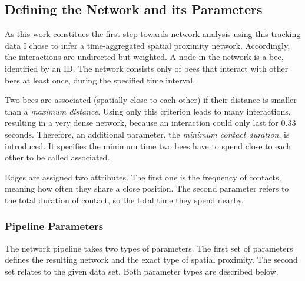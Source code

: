 \subsection{Defining the Network and its Parameters}
As this work constitues the first step towards network analysis using this tracking data I chose to infer a time-aggregated spatial proximity network.
Accordingly, the interactions are undirected but weighted.
A node in the network is a bee, identified by an ID.
The network consists only of bees that interact with other bees at least once, during the specified time interval.

Two bees are associated (spatially close to each other) if their distance is smaller than a \emph{maximum distance}.
Using only this criterion leads to many interactions, resulting in a very dense network, because an interaction could only last for 0.33 seconds.
Therefore, an additional parameter, the \emph{minimum contact duration}, is introduced.
It specifies the minimum time two bees have to spend close to each other to be called associated.

Edges are assigned two attributes.
The first one is the frequency of contacts, meaning how often they share a close position. The second parameter refers to the total duration of contact, so the total time they spend nearby.

\subsubsection{Pipeline Parameters}
The network pipeline takes two types of parameters. The first set of parameters defines the resulting network and the exact type of spatial proximity. The second set relates to the given data set. Both parameter types are described below.


